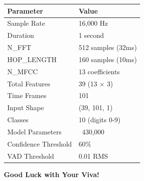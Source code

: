 \documentclass[a4paper,12pt]{article}
\begin{document}
\begin{tabular}{|l|l|}
\hline
\textbf{Parameter} & \textbf{Value} \\
\hline
Sample Rate & 16,000 Hz \\
\hline
Duration & 1 second \\
\hline
N\_FFT & 512 samples (32ms) \\
\hline
HOP\_LENGTH & 160 samples (10ms) \\
\hline
N\_MFCC & 13 coefficients \\
\hline
Total Features & 39 (13 × 3) \\
\hline
Time Frames & 101 \\
\hline
Input Shape & (39, 101, 1) \\
\hline
Classes & 10 (digits 0-9) \\
\hline
Model Parameters & ~430,000 \\
\hline
Confidence Threshold & 60\% \\
\hline
VAD Threshold & 0.01 RMS \\
\hline
\end{tabular}

\vspace{1cm}
\begin{center}
\textbf{Good Luck with Your Viva!}
\end{center}
\end{document}
